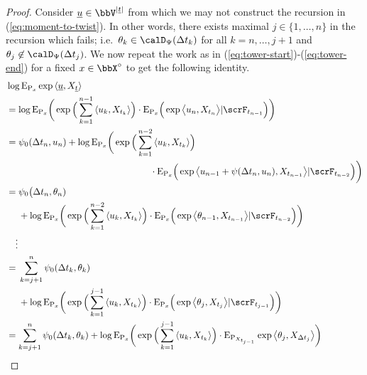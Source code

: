 \begin{proof}
  \label{proof:proposition:moment-to-twist}
  Consider $\underline\momentVar \in \vecSpace^{|\underline t|}$ from which we may not construct the recursion in (\ref{eq:moment-to-twist}).
  In other words, there exists maximal $j \in \{1, \ldots, n\}$ in the recursion which fails; i.e.\ $\twistVar_k \in \momentSpace(\Delta t_k)$ for all $k = n, \ldots, j+1$ and $\twistVar_j \not\in\momentSpace(\Delta t_j)$.
  We now repeat the work as in (\ref{eq:tower-start})-(\ref{eq:tower-end}) for a fixed $\stateVar \in \stateSpace^\circ$ to get the following identity.
  \begin{align*}
    &\log\Exp_{\Prb_\stateVar}\exp\prj{\underline\momentVar}{\X_{\underline t}} \\
    &= \log\Exp_{\Prb_\stateVar}\bigg( \exp\Big(\sum_{k=1}^{n-1} \prj{\momentVar_k}{\X_{t_k}}\Big) \cdot \Exp_{\Prb_\stateVar}\Big( \exp\bprj{\momentVar_n}{\X_{t_n}} |\scrF_{t_{n-1}} \Big) \bigg) \\
    &= \begin{aligned}[t]
      &\affPart_0(\Delta t_n, \momentVar_n) 
      + \log\Exp_{\Prb_\stateVar}\bigg( \exp\Big(\sum_{k=1}^{n-2} \prj{\momentVar_k}{\X_{t_k}}\Big) \\
      &\hspace{50mm} \cdot \Exp_{\Prb_\stateVar}\Big( \exp\bprj{\momentVar_{n-1} + \affPart(\Delta t_n, \momentVar_n)}{\X_{t_{n-1}}} | \scrF_{t_{n-2}} \Big)  \bigg) 
    \end{aligned} \\
    &= \begin{aligned}[t]
      &\affPart_0\big(\Delta t_n, \twistVar_n) \\
      &+ \log\Exp_{\Prb_\stateVar}\bigg( \exp\Big(\sum_{k=1}^{n-2} \prj{\momentVar_k}{\X_{t_k}}\Big) \cdot \Exp_{\Prb_\stateVar}\Big( \exp\bprj{\twistVar_{n-1}}{\X_{t_{n-1}}} | \scrF_{t_{n-2}} \Big)  \bigg) 
    \end{aligned} \\
    & \quad\vdots \\
    &= \begin{aligned}[t]
      &\sum_{k=j+1}^n \affPart_0(\Delta t_k, \twistVar_k) \\
      &+ \log\Exp_{\Prb_\stateVar}\bigg( \exp\Big(\sum_{k=1}^{j-1} \prj{\momentVar_k}{\X_{t_k}}\Big) \cdot \Exp_{\Prb_\stateVar}\Big( \exp\bprj{\twistVar_j}{\X_{t_j}} |\scrF_{t_{j-1}} \Big) \bigg)
    \end{aligned} \\
    &= \sum_{k=j+1}^n \affPart_0(\Delta t_k, \twistVar_k) + \log\Exp_{\Prb_\stateVar}\bigg( \exp\Big(\sum_{k=1}^{j-1} \prj{\momentVar_k}{\X_{t_k}}\Big) \cdot \Exp_{\Prb_{\X_{t_{j-1}}}} \exp\bprj{\twistVar_j}{\X_{\Delta t_j}} \bigg)

\end{align*}
\end{proof}
